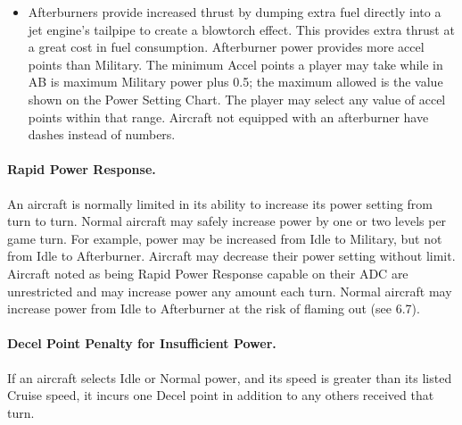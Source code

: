 {\begin{itemize}
    \item{} Afterburners provide increased thrust by dumping extra fuel directly into a jet engine's tailpipe to create a blowtorch effect. This provides extra thrust at a great cost in fuel consumption. Afterburner power provides more accel points than Military. The minimum Accel points a player may take while in AB is maximum Military power plus 0.5; the maximum allowed is the value shown on the Power Setting Chart. The player may select any value of accel points within that range. Aircraft not equipped with an afterburner have dashes instead of numbers.

\end{itemize}

\paragraph{Rapid Power Response.} An aircraft is normally limited in its ability to increase its power setting from turn to turn. Normal aircraft may safely increase power by one or two levels per game turn. For example, power may be increased from Idle to Military, but not from Idle to Afterburner. Aircraft may decrease their power setting without limit. Aircraft noted as being Rapid Power Response capable on their ADC are unrestricted and may increase power any amount each turn. Normal aircraft may increase power from Idle to Afterburner at the risk of flaming out (see 6.7).

\paragraph{Decel Point Penalty for Insufficient Power.} If an aircraft selects Idle or Normal power, and its speed is greater than its listed Cruise speed, it incurs one Decel point in addition to any others received that turn.
}

\label{rule:acceleration-and-deceleration-points}



